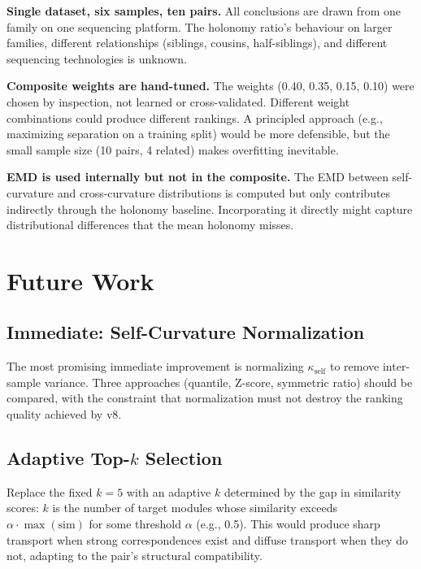 \documentclass{../yalumba}
\begin{document}
\begin{limitation}
\textbf{Single dataset, six samples, ten pairs.}  All conclusions are
drawn from one family on one sequencing platform.  The holonomy ratio's
behaviour on larger families, different relationships (siblings, cousins,
half-siblings), and different sequencing technologies is unknown.
\end{limitation}

\begin{limitation}
\textbf{Composite weights are hand-tuned.}  The weights (0.40, 0.35, 0.15,
0.10) were chosen by inspection, not learned or cross-validated.  Different
weight combinations could produce different rankings.  A principled approach
(e.g., maximizing separation on a training split) would be more defensible,
but the small sample size (10 pairs, 4 related) makes overfitting inevitable.
\end{limitation}

\begin{limitation}
\textbf{EMD is used internally but not in the composite.}  The EMD between
self-curvature and cross-curvature distributions is computed but only
contributes indirectly through the holonomy baseline.  Incorporating it
directly might capture distributional differences that the mean holonomy
misses.
\end{limitation}


\section{Future Work}
\label{sec:future}

\subsection{Immediate: Self-Curvature Normalization}

The most promising immediate improvement is normalizing
$\kappa_{\text{self}}$ to remove inter-sample variance.  Three approaches
(quantile, Z-score, symmetric ratio) should be compared, with the
constraint that normalization must not destroy the ranking quality achieved
by v8.

\subsection{Adaptive Top-$k$ Selection}

Replace the fixed $k = 5$ with an adaptive $k$ determined by the gap in
similarity scores: $k$ is the number of target modules whose similarity
exceeds $\alpha \cdot \max(\text{sim})$ for some threshold $\alpha$
(e.g., 0.5).  This would produce sharp transport when strong correspondences
exist and diffuse transport when they do not, adapting to the pair's
structural compatibility.
\end{document}
